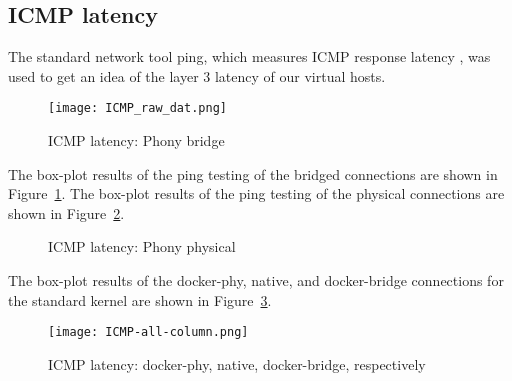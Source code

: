 \subsection{ICMP latency} %
\label{sub:icmplatency}
The standard network tool ping, which measures ICMP response latency \autocite{pingexplained}, was used to get an idea of the layer 3 latency of our virtual hosts.  
\begin{figure}
    \centering
    \texttt{[image: ICMP\_raw\_dat.png]}
%    
    \caption{ICMP latency: Phony bridge}
    \label{fig:icmplatencybridge}
\end{figure}
The box-plot results of the ping testing of the bridged connections are shown in Figure~\ref{fig:icmplatencybridge}.  
The box-plot results of the ping testing of the physical connections are shown in Figure~\ref{fig:icmplatencyphys}.  
\begin{figure}
    \centering
    \def\svgwidth{\columnwidth}
    
    \caption{ICMP latency: Phony physical}
    \label{fig:icmplatencyphys}
\end{figure}
The box-plot results of the docker-phy, native, and docker-bridge connections for the standard kernel are shown in Figure~\ref{fig:icmplatencyphony}.  
\begin{figure}
    \centering
    \texttt{[image: ICMP-all-column.png]}
    \caption{ICMP latency: docker-phy, native, docker-bridge, respectively}
    \label{fig:icmplatencyphony}
\end{figure}


